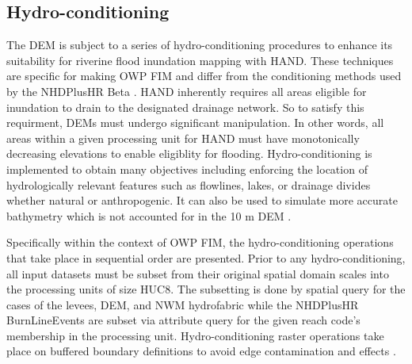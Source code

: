 \documentclass[draft]{dependencies/agujournal2019}
\begin{document}
\subsection{Hydro-conditioning}
\label{ssec:hydro_conditioning}
%
The DEM is subject to a series of hydro-conditioning procedures to enhance its suitability for riverine flood inundation mapping with HAND. 
These techniques are specific for making OWP FIM and differ from the conditioning methods used by the NHDPlusHR Beta \cite{moore2019user}.
HAND inherently requires all areas eligible for inundation to drain to the designated drainage network.
So to satisfy this requirment, DEMs must undergo significant manipulation.
In other words, all areas within a given processing unit for HAND must have monotonically decreasing elevations to enable eligiblity for flooding.
Hydro-conditioning is implemented to obtain many objectives including enforcing the location of hydrologically relevant features such as flowlines, lakes, or drainage divides whether natural or anthropogenic. 
It can also be used to simulate more accurate bathymetry which is not accounted for in the 10 m DEM \cite{gesch2002national}.

Specifically within the context of OWP FIM, the hydro-conditioning operations that take place in sequential order are presented. 
Prior to any hydro-conditioning, all input datasets must be subset from their original spatial domain scales into the processing units of size HUC8. 
The subsetting is done by spatial query for the cases of the levees, DEM, and NWM hydrofabric while the NHDPlusHR BurnLineEvents are subset via attribute query for the given reach code's membership in the processing unit.
Hydro-conditioning raster operations take place on buffered boundary definitions to avoid edge contamination and effects \cite{lindsay2013measuring}. 
%
\end{document}
